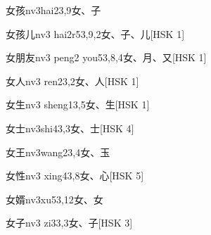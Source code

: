 \begin{EntryWithPhonetic}{女孩}{nv3hai2}{3,9}{⼥、⼦}
\end{EntryWithPhonetic}

\begin{EntryWithPhonetic}{女孩儿}{nv3 hai2r5}{3,9,2}{⼥、⼦、⼉}[HSK 1]
\end{EntryWithPhonetic}

\begin{EntryWithPhonetic}{女朋友}{nv3 peng2 you5}{3,8,4}{⼥、⽉、⼜}[HSK 1]
\end{EntryWithPhonetic}

\begin{EntryWithPhonetic}{女人}{nv3 ren2}{3,2}{⼥、⼈}[HSK 1]
\end{EntryWithPhonetic}

\begin{EntryWithPhonetic}{女生}{nv3 sheng1}{3,5}{⼥、⽣}[HSK 1]
\end{EntryWithPhonetic}

\begin{EntryWithPhonetic}{女士}{nv3shi4}{3,3}{⼥、⼠}[HSK 4]
\end{EntryWithPhonetic}

\begin{EntryWithPhonetic}{女王}{nv3wang2}{3,4}{⼥、⽟}
\end{EntryWithPhonetic}

\begin{EntryWithPhonetic}{女性}{nv3 xing4}{3,8}{⼥、⼼}[HSK 5]
\end{EntryWithPhonetic}

\begin{EntryWithPhonetic}{女婿}{nv3xu5}{3,12}{⼥、⼥}
\end{EntryWithPhonetic}

\begin{EntryWithPhonetic}{女子}{nv3 zi3}{3,3}{⼥、⼦}[HSK 3]
\end{EntryWithPhonetic}


